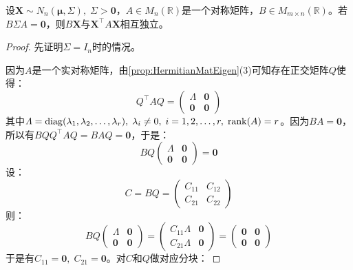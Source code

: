 \begin{theorem}\label{theo:BXXAXIndependent}
	设$\mathbf{X}\sim N_n(\boldsymbol{\mu},\Sigma),\;\Sigma>\mathbf{0}$，$A\in M_{n}(\mathbb{R})$是一个对称矩阵，$B\in M_{m\times n}(\mathbb{R})$。若$B\Sigma A=\mathbf{0}$，则$B\mathbf{X}$与$\mathbf{X}^{\top}A\mathbf{X}$相互独立。
\end{theorem}
\begin{proof}
	先证明$\Sigma=I_n$时的情况。\par
	因为$A$是一个实对称矩阵，由\cref{prop:HermitianMatEigen}(3)可知存在正交矩阵$Q$使得：
	\begin{equation*}
		Q^{\top}AQ=
		\begin{pmatrix}
			\varLambda & \mathbf{0} \\
			\mathbf{0} & \mathbf{0}
		\end{pmatrix}
	\end{equation*}
	其中$\varLambda=\operatorname{diag}(\lambda_1, \lambda_2, \dots, \lambda_{r}),\;\lambda_i\ne0,\;i=1,2,\dots,r,\;\operatorname{rank}(A)=r$。因为$BA=\mathbf{0}$，所以有$BQQ^{\top}AQ=BAQ=\mathbf{0}$，于是：
	\begin{equation*}
		BQ
		\begin{pmatrix}
			\varLambda & \mathbf{0} \\
			\mathbf{0} & \mathbf{0}
		\end{pmatrix}
		=\mathbf{0}
	\end{equation*}
	设：
	\begin{equation*}
		C=BQ=
		\begin{pmatrix}
			C_{11} & C_{12} \\
			C_{21} & C_{22}
		\end{pmatrix}
	\end{equation*}
	则：
	\begin{equation*}
		BQ
		\begin{pmatrix}
			\varLambda & \mathbf{0} \\
			\mathbf{0} & \mathbf{0}
		\end{pmatrix}
		=
		\begin{pmatrix}
			C_{11}\varLambda & \mathbf{0} \\
			C_{21}\varLambda & \mathbf{0}
		\end{pmatrix}
		=\begin{pmatrix}
			\mathbf{0} & \mathbf{0} \\
			\mathbf{0} & \mathbf{0}
		\end{pmatrix}
	\end{equation*}
	于是有$C_{11}=\mathbf{0},\;C_{21}=\mathbf{0}$。对$C$和$Q$做对应分块：

\end{proof}
